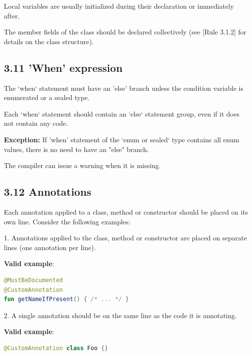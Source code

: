 {{{{Local variables are usually initialized during their declaration or immediately after.

The member fields of the class should be declared collectively (see [Rule 3.1.2] for details on the class structure).



\subsection*{\textbf{3.11 'When' expression}}

\label{sec:3.11}



The `when` statement must have an 'else' branch unless the condition variable is enumerated or a sealed type.

Each `when` statement should contain an `else` statement group, even if it does not contain any code.



\textbf{Exception:} If 'when' statement of the `enum or sealed` type contains all enum values, there is no need to have an "else" branch.

The compiler can issue a warning when it is missing.



\subsection*{\textbf{3.12 Annotations}}

\label{sec:3.12}



Each annotation applied to a class, method or constructor should be placed on its own line. Consider the following examples:

1. Annotations applied to the class, method or constructor are placed on separate lines (one annotation per line). 



\textbf{Valid example}:

\begin{lstlisting}[language=Kotlin]
@MustBeDocumented
@CustomAnnotation
fun getNameIfPresent() { /* ... */ }
\end{lstlisting}


2. A single annotation should be on the same line as the code it is annotating.



\textbf{Valid example}:

\begin{lstlisting}[language=Kotlin]
@CustomAnnotation class Foo {}
\end{lstlisting}


}}}}
